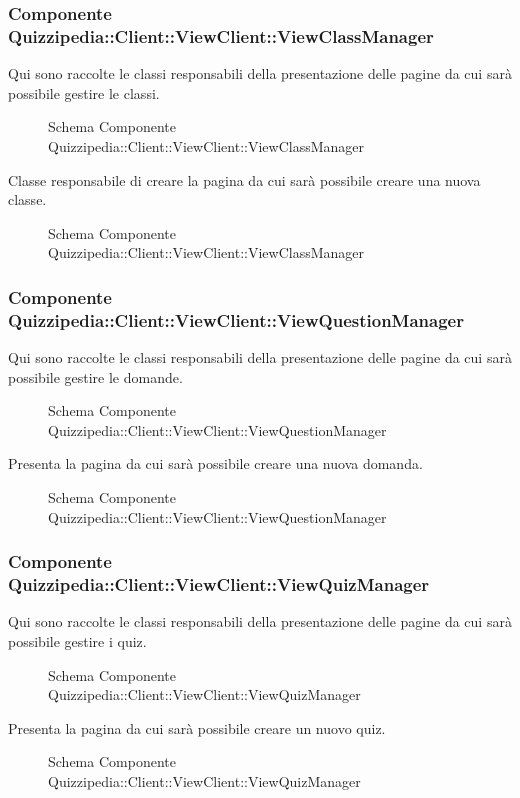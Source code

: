 \subsubsection{Componente Quizzipedia::Client::ViewClient::ViewClassManager}
Qui sono raccolte le classi responsabili della presentazione delle pagine da cui sarà possibile gestire le classi.
\begin{figure}[H]
\centering
\noindent{}
\caption{Schema Componente Quizzipedia::Client::ViewClient::ViewClassManager}
\end{figure}
Classe responsabile di creare la pagina da cui sarà possibile creare una nuova classe.
\begin{figure}[H]
\centering
\noindent{}
\caption{Schema Componente Quizzipedia::Client::ViewClient::ViewClassManager}
\end{figure}
\subsubsection{Componente Quizzipedia::Client::ViewClient::ViewQuestionManager}
Qui sono raccolte le classi responsabili della presentazione delle pagine da cui sarà possibile gestire le domande.
\begin{figure}[H]
\centering
\noindent{}
\caption{Schema Componente Quizzipedia::Client::ViewClient::ViewQuestionManager}
\end{figure}
Presenta la pagina da cui sarà possibile creare una nuova domanda.
\begin{figure}[H]
\centering
\noindent{}
\caption{Schema Componente Quizzipedia::Client::ViewClient::ViewQuestionManager}
\end{figure}
\subsubsection{Componente Quizzipedia::Client::ViewClient::ViewQuizManager}
Qui sono raccolte le classi responsabili della presentazione delle pagine da cui sarà possibile gestire i quiz.
\begin{figure}[H]
\centering
\noindent{}
\caption{Schema Componente Quizzipedia::Client::ViewClient::ViewQuizManager}
\end{figure}
Presenta la pagina da cui sarà possibile creare un nuovo quiz.
\begin{figure}[H]
\centering
\noindent{}
\caption{Schema Componente Quizzipedia::Client::ViewClient::ViewQuizManager}
\end{figure}
